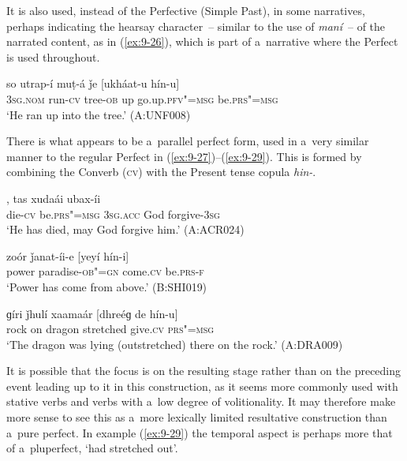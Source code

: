 It is also used, instead of the Perfective (Simple Past), in some narratives, perhaps indicating the hearsay character~-- similar to the use of \textit{maní}~-- of the narrated content, as in (\ref{ex:9-26}), which is part of a~narrative where the Perfect is used throughout.

\begin{exe}
\ex
\label{ex:9-26}
\gll so utrap-í muṭ-á ǰe [ukháat-u hín-u] \\
\textsc{3sg.nom} run-\textsc{cv} tree-\textsc{ob} up go.up.\textsc{pfv"=msg} be.\textsc{prs"=msg} \\
\glt `He ran up into the tree.' (A:UNF008) 
\end{exe}

There is what appears to be a~parallel perfect form, used in a~very similar manner to the regular Perfect in (\ref{ex:9-27})--(\ref{ex:9-29}). This is formed by combining the Converb (\textsc{cv}) with the Present tense copula \textit{hin-}.

\begin{exe}
\ex
\label{ex:9-27}
, tas xudaái ubax-íi \\
die-\textsc{cv} be.\textsc{prs"=msg} \textsc{3sg.acc} God forgive-\textsc{3sg} \\
\glt `He has died, may God forgive him.' (A:ACR024)

\ex
\label{ex:9-28}
\gll zoór ǰanat-íi-e [yeyí hín-i] \\
power paradise-\textsc{ob"=gn} come.\textsc{cv} be.\textsc{prs-f} \\
\glt `Power has come from above.' (B:SHI019)

\ex
\label{ex:9-29}
\gll ɡíri ǰhulí xaamaár [dhreéɡ de hín-u] \\
rock on dragon stretched give.\textsc{cv} \textsc{prs"=msg} \\
\glt `The dragon was lying (outstretched) there on the rock.' (A:DRA009)
\end{exe}

It is possible that the focus is on the resulting stage rather than on the preceding event leading up to it in this construction, as it seems more commonly used with stative verbs and verbs with a~low degree of volitionality. It may therefore make more sense to see this as a~more lexically limited resultative construction \citep[135]{dahl1985} than a~pure perfect. In example (\ref{ex:9-29}) the temporal aspect is perhaps more that of a~pluperfect, `had stretched out'. 



